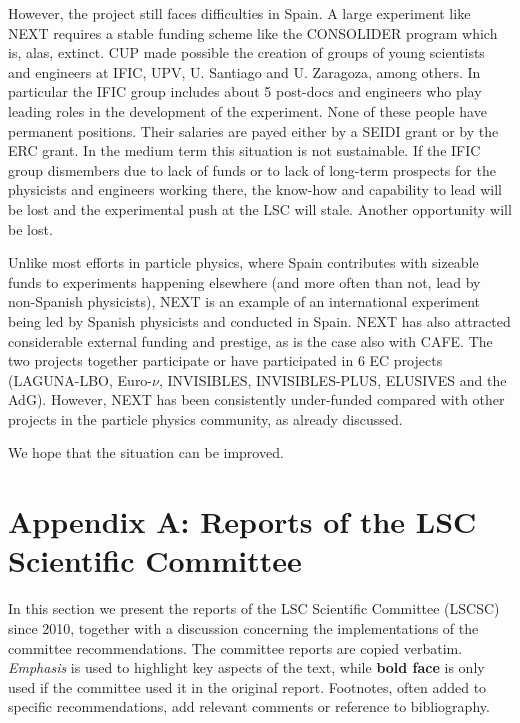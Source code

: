 \documentclass[a4paper,11pt,oneside]{article}
\begin{document}
However, the project still faces difficulties in Spain. A large experiment like NEXT requires a stable funding scheme like the CONSOLIDER program which is, alas, extinct. CUP made possible the creation of groups of young scientists and engineers at IFIC, UPV, U. Santiago and U. Zaragoza, among others. In particular the IFIC group includes about 5 post-docs and engineers who play leading roles in the development of the experiment. None of these people have permanent positions. Their salaries are payed either by a SEIDI grant or by the ERC grant. In the medium term this situation is not sustainable. If the IFIC group dismembers due to lack of funds or to lack of long-term prospects for the physicists and engineers working there, the know-how and capability to lead will be lost and the experimental push at the LSC will stale. Another opportunity will be lost. 

Unlike most efforts in particle physics, where Spain contributes with sizeable funds to experiments happening elsewhere (and more often than not, lead by non-Spanish physicists), NEXT is an example of an international experiment being led by Spanish physicists and conducted in Spain. NEXT has also attracted considerable external funding and prestige, as is the case also with CAFE. The two projects together participate or have participated in 6 EC projects (LAGUNA-LBO, Euro-$\nu$, INVISIBLES, INVISIBLES-PLUS, ELUSIVES and the AdG). However, NEXT has been consistently under-funded compared with other projects in the particle physics community, as already discussed. 

We hope that the situation can be improved.  

\section{\bf \textsf{Appendix A: Reports of the LSC Scientific Committee }}
In this section we present the reports of the LSC Scientific Committee (LSCSC) since 2010, together with a discussion concerning the implementations of the committee recommendations. The committee reports are copied verbatim. {\em Emphasis} is used to highlight key aspects of the text, while {\bf bold face} is only used if the committee used it in the original report. Footnotes, often added to specific recommendations, add relevant comments or reference to bibliography. 








%



\end{document}
